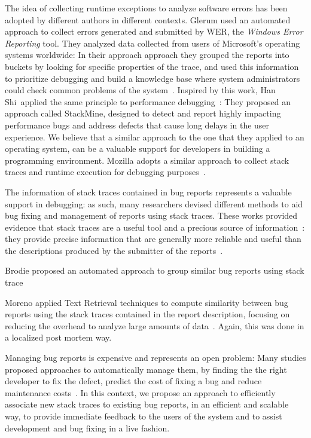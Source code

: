 The idea of collecting runtime exceptions to analyze software errors has been adopted by different authors in different contexts.
Glerum \etal used an automated approach to collect errors generated and submitted by WER, the \emph{Windows Error Reporting} tool.
They analyzed data collected from users of Microsoft's operating systems worldwide: In their approach approach they grouped the reports into buckets by looking for specific properties of the trace, and used this information to prioritize debugging and build a knowledge base where system administrators could check common problems of the system~\cite{Glerum2009}.
Inspired by this work, Han Shi~\etal applied the same principle to performance debugging~\cite{Han2012}: They proposed an approach called StackMine, designed to detect and report highly impacting performance bugs and address defects that cause long delays in the user experience.
We believe that a similar approach to the one that they applied to an operating system, can be a valuable support for developers in building a programming environment.
Mozilla adopts a similar approach to collect stack traces and runtime execution for debugging purposes~\cite{McLa2004}.

The information of stack traces contained in bug reports represents a valuable support in debugging: as such, many researchers devised different methods to aid bug fixing and management of reports using stack traces.
These works provided evidence that stack traces are a useful tool and a precious source of information~\cite{Davie2013,Wang2013,Brod2005,Weis2007a}: they provide precise information that are generally more reliable and useful than the descriptions produced by the submitter of the reports~\cite{Ko2006}.

Brodie \etal proposed an automated approach to group similar bug reports using stack trace~\cite{Brod2005}

Moreno \etal applied Text Retrieval techniques to compute similarity between bug reports using the stack traces contained in the report description, focusing on reducing the overhead to analyze large amounts of data~\cite{Moreno2014}.
Again, this was done in a localized post mortem way.

Managing bug reports is expensive and represents an open problem: Many studies proposed approaches to automatically manage them, by finding the the right developer to fix the defect, predict the cost of fixing a bug and reduce maintenance costs~\cite{Matt2009,Anvi2006a,Sliw2005,DAmb2010c}.
In this context, we propose an approach to efficiently associate new stack traces to existing bug reports, in an efficient and scalable way, to provide immediate feedback to the users of the system and to assist development and bug fixing in a live fashion.




